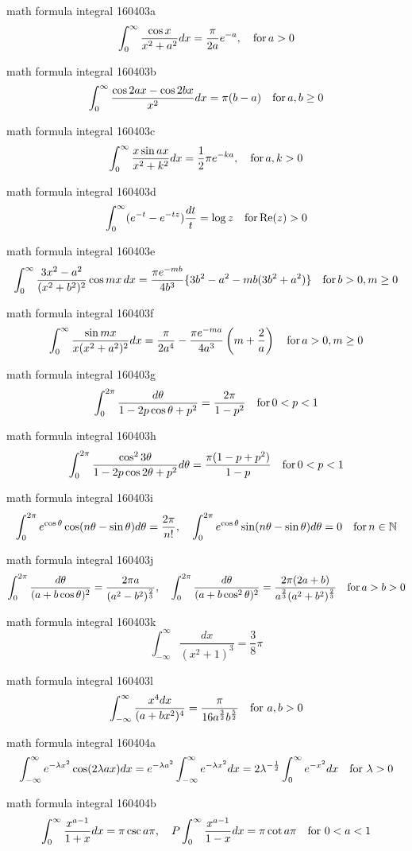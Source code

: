 math formula integral 160403a
$$
\int^\infty_0\frac{\cos x}{x^2+a^2}dx=\frac{\pi}{2a}e^{-a},\quad{\rm for}\,a>0
$$

math formula integral 160403b
$$
\int^\infty_0\frac{\cos 2ax-\cos 2bx}{x^2}dx=\pi(b-a) \quad{\rm for}\,a,b\ge 0
$$

math formula integral 160403c
$$
\int^\infty_0\frac{x \sin ax}{x^2+k^2}dx=\frac{1}{2}\pi e^{-ka},\quad{\rm for}\,a,k>0
$$

math formula integral 160403d
$$
\int^\infty_0(e^{-t}-e^{-tz})\frac{dt}{t}=\log z\quad{\rm for}\,{\rm Re}(z)>0
$$

math formula integral 160403e
$$
\int^\infty_0\frac{3x^2-a^2}{(x^2+b^2)^2}\cos mx \, dx=\frac{\pi e^{-mb}}{4b^3}\{3b^2-a^2-mb(3b^2+a^2)\} \quad{\rm for}\,b>0,m\ge 0
$$

math formula integral 160403f
$$
\int^\infty_0\frac{\sin mx}{x(x^2+a^2)^2}dx=\frac{\pi}{2a^4}-\frac{\pi e^{-ma}}{4a^3}\left(m+\frac{2}{a}\right) \quad{\rm for}\,a>0,m\ge 0
$$

math formula integral 160403g
$$
\int^{2\pi}_0\frac{d\theta}{1-2p\cos\theta+p^2}=\frac{2\pi}{1-p^2} \quad{\rm for}\, 0<p<1
$$

math formula integral 160403h
$$
\int^{2\pi}_0\frac{\cos^2 3\theta}{1-2p\cos2\theta+p^2}d\theta=\frac{\pi(1-p+p^2)}{1-p} \quad{\rm for}\, 0<p<1
$$

math formula integral 160403i
$$
\int^{2\pi}_0 e^{\cos\theta}\cos(n\theta-\sin\theta)d\theta=\frac{2\pi}{n!},\quad \int^{2\pi}_0 e^{\cos\theta}\sin(n\theta-\sin\theta)d\theta=0 \quad{\rm for}\, n\in{\mathbb N}
$$

math formula integral 160403j
$$
\int^{2\pi}_0 \frac{d\theta}{(a+b\cos\theta)^2}=\frac{2\pi a}{(a^2-b^2)^{\frac{2}{3}}},\quad \int^{2\pi}_0 \frac{d\theta}{(a+b\cos^2\theta)^2}=\frac{2\pi (2a+b)}{a^{\frac{2}{3}}(a^2+b^2)^{\frac{2}{3}}} \quad{\rm for}\, a>b>0
$$

math formula integral 160403k
$$
\int^\infty_{-\infty} \frac{dx}{(x^2+1)^3}=\frac{3}{8}\pi
$$

math formula integral 160403l
$$
\int^\infty_{-\infty} \frac{x^4 dx}{(a+bx^2)^4}=\frac{\pi}{16 a^{\frac{3}{2}}b^{\frac{5}{2}}} \quad {\rm for}\,\,a,b>0
$$

math formula integral 160404a
$$
\int^\infty_{-\infty} e^{-\lambda x^2}\cos(2\lambda a x)dx=e^{-\lambda a^2}\int^\infty_{-\infty} e^{-\lambda x^2}dx=2\lambda^{-\frac{1}{2}}\int^\infty_{0} e^{-x^2}dx \quad {\rm for}\,\,\lambda>0
$$

math formula integral 160404b
$$
\int^\infty_0 \frac{x^{a-1}}{1+x}dx=\pi \csc a\pi, \quad P\int^\infty_0 \frac{x^{a-1}}{1-x}dx=\pi \cot a\pi \quad {\rm for}\,\,0<a<1
$$


